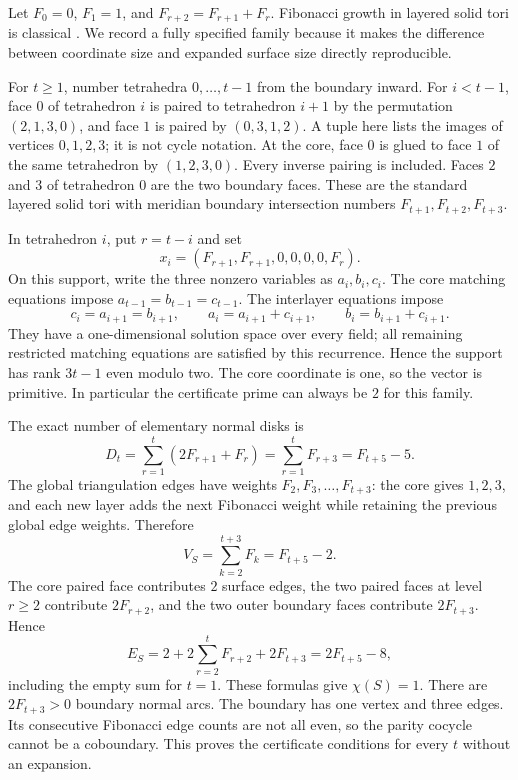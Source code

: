 Let $F_0=0$, $F_1=1$, and $F_{r+2}=F_{r+1}+F_r$. Fibonacci growth in
layered solid tori is classical \cite{jaco-rubinstein}. We record a fully
specified family because it makes the difference between coordinate size
and expanded surface size directly reproducible.

For $t\geq1$, number tetrahedra $0,\ldots,t-1$ from the boundary inward.
For $i<t-1$, face $0$ of tetrahedron $i$ is paired to tetrahedron $i+1$
by the permutation $(2,1,3,0)$, and face $1$ is paired by
$(0,3,1,2)$. A tuple here lists the images of vertices $0,1,2,3$; it is
not cycle notation. At the core, face $0$ is glued to face $1$ of the same
tetrahedron by $(1,2,3,0)$. Every inverse pairing is included. Faces $2$
and $3$ of tetrahedron $0$ are the two boundary faces. These are the
standard layered solid tori with meridian boundary intersection numbers
$F_{t+1},F_{t+2},F_{t+3}$.

In tetrahedron $i$, put $r=t-i$ and set
\begin{equation}
 x_i=(F_{r+1},F_{r+1},0,0,0,0,F_r).
 \label{eq:fibonacci-vector}
\end{equation}
On this support, write the three nonzero variables as $a_i,b_i,c_i$.
The core matching equations impose $a_{t-1}=b_{t-1}=c_{t-1}$.
The interlayer equations impose
\[
 c_i=a_{i+1}=b_{i+1},\qquad
 a_i=a_{i+1}+c_{i+1},\qquad
 b_i=b_{i+1}+c_{i+1}.
\]
They have a one-dimensional solution space over every field; all remaining
restricted matching equations are satisfied by this recurrence. Hence
the support has rank $3t-1$ even modulo two. The core coordinate is one,
so the vector is primitive. In particular the certificate prime can always
be $2$ for this family.

The exact number of elementary normal disks is
\begin{equation}
 D_t=\sum_{r=1}^{t}(2F_{r+1}+F_r)
     =\sum_{r=1}^{t}F_{r+3}=F_{t+5}-5.
 \label{eq:disk-count}
\end{equation}
The global triangulation edges have weights
$F_2,F_3,\ldots,F_{t+3}$: the core gives $1,2,3$, and each new layer
adds the next Fibonacci weight while retaining the previous global edge
weights. Therefore
\[
 V_S=\sum_{k=2}^{t+3}F_k=F_{t+5}-2.
\]
The core paired face contributes $2$ surface edges, the two paired faces
at level $r\geq2$ contribute $2F_{r+2}$, and the two outer boundary
faces contribute $2F_{t+3}$. Hence
\[
 E_S=2+2\sum_{r=2}^{t}F_{r+2}+2F_{t+3}
     =2F_{t+5}-8,
\]
including the empty sum for $t=1$. These formulas give $\chi(S)=1$.
There are $2F_{t+3}>0$ boundary normal arcs. The boundary has one vertex
and three edges. Its consecutive Fibonacci edge counts are not all even,
so the parity cocycle cannot be a coboundary. This proves the certificate
conditions for every $t$ without an expansion.

